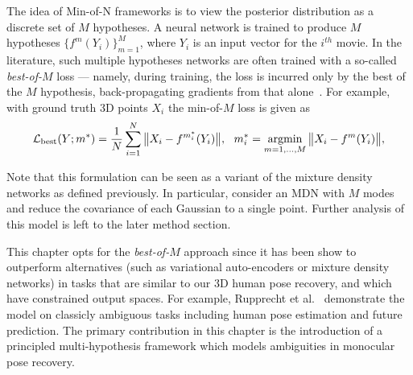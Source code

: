 The idea of Min-of-N frameworks is to view the posterior distribution as a discrete set of $M$ hypotheses. A neural network is trained to produce $M$ hypotheses $\{f^{m}(Y_{i})\}_{m=1}^{M}$, where $Y_{i}$ is an input vector for the $i^{th}$ movie. In the literature, such multiple hypotheses networks are often trained with a so-called \emph{best-of-$M$} loss --- namely, during training, the loss is incurred only by the best of the $M$ hypothesis, back-propagating gradients from that alone~\cite{guzman2012multiple}. For example, with ground truth 3D points $X_{i}$ the min-of-$M$ loss is given as
\begin{equation}
  \mathcal{L}_\text{best}(Y;m^*)
  =
  \frac{1}{N}
  \sum_{i=1}^N
  \big \| X_{i} - f^{m_i^*}(Y_{i}) \big \|,
  ~~
  m_i^*
  =
  \operatornamewithlimits{argmin}_{m=1,\dots,M}
  \big \| X_{i} -  f^{m}(Y_{i}) \big \|,
\end{equation}

Note that this formulation can be seen as a variant of the mixture density networks as defined previously. In particular, consider an MDN with $M$ modes and reduce the covariance of each Gaussian to a single point. Further analysis of this model is left to the later method section.

This chapter opts for the \emph{best-of-$M$} approach since it has been show to outperform  alternatives (such as variational auto-encoders or mixture density networks) in tasks that are similar to our 3D human pose recovery, and which have constrained output spaces. For example, Rupprecht et al.~\cite{rupprecht17learning} demonstrate the model on classicly ambiguous tasks including human pose estimation and future prediction. The primary contribution in this chapter is the introduction of a principled multi-hypothesis framework which models ambiguities in monocular pose recovery.






